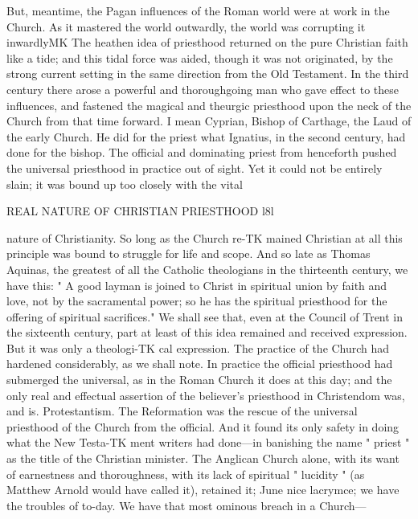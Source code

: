 \documentclass[12pt,a5paper,oneside]{book}
\begin{document}
{But, meantime, the Pagan influences of the Roman 
world were at work in the Church. As it mastered 
the world outwardly, the world was corrupting it 
inwardlyMK The heathen idea of priesthood returned 
on the pure Christian faith like a tide; and this tidal 
force was aided, though it was not originated, by the 
strong current setting in the same direction from the 
Old Testament. In the third century there arose a 
powerful and thoroughgoing man who gave effect 
to these influences, and fastened the magical and 
theurgic priesthood upon the neck of the Church 
from that time forward. I mean Cyprian, Bishop 
of Carthage, the Laud of the early Church. He did 
for the priest what Ignatius, in the second century, 
had done for the bishop. The official and dominating 
priest from henceforth pushed the universal priesthood 
in practice out of sight. Yet it could not be entirely 
slain; it was bound up too closely with the vital 



REAL NATURE OF CHRISTIAN PRIESTHOOD l8l 

nature of Christianity. So long as the Church re-TK
mained Christian at all this principle was bound to 
struggle for life and scope. And so late as Thomas 
Aquinas, the greatest of all the Catholic theologians in 
the thirteenth century, we have this: " A good layman 
is joined to Christ in spiritual union by faith and love, 
not by the sacramental power; so he has the spiritual 
priesthood for the offering of spiritual sacrifices." We 
shall see that, even at the Council of Trent in the 
sixteenth century, part at least of this idea remained 
and received expression. But it was only a theologi-TK
cal expression. The practice of the Church had 
hardened considerably, as we shall note. In practice 
the official priesthood had submerged the universal, as 
in the Roman Church it does at this day; and the 
only real and effectual assertion of the believer's 
priesthood in Christendom was, and is. Protestantism. 
The Reformation was the rescue of the universal 
priesthood of the Church from the official. And it 
found its only safety in doing what the New Testa-TK
ment writers had done---in banishing the name 
" priest " as the title of the Christian minister. The 
Anglican Church alone, with its want of earnestness 
and thoroughness, with its lack of spiritual " lucidity " 
(as Matthew Arnold would have called it), retained it; 
June nice lacrymce; we have the troubles of to-day. 
We have that most ominous breach in a Church---



}
\end{document}
